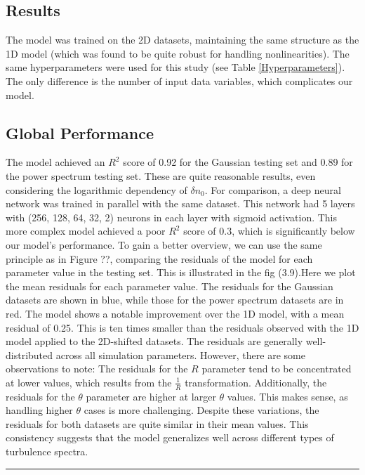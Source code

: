 \documentclass[11pt,a4paper,openany]{report}
\begin{document}
\begin{multicols}{2}
    \section{Results}

    The model was trained on the 2D datasets, maintaining the same structure as the 1D model (which was found to be quite robust for handling nonlinearities). The same hyperparameters were used for this study (see Table \ref{Hyperparameters}). The only difference is the number of input data variables, which complicates our model.

    \subsection{Global Performance}

    The model achieved an $R^2$ score of 0.92 for the Gaussian testing set and 0.89 for the power spectrum testing set. These are quite reasonable results, even considering the logarithmic dependency of $\delta n_0$. For comparison, a deep neural network was trained in parallel with the same dataset. This network had 5 layers with (256, 128, 64, 32, 2) neurons in each layer with sigmoid activation. This more complex model achieved a poor $R^2$ score of 0.3, which is significantly below our model's performance. To gain a better overview, we can use the same principle as in Figure ??, comparing the residuals of the model for each parameter value in the testing set. This is illustrated in the fig (3.9).{Here we plot the mean residuals for each parameter value. The residuals for the Gaussian datasets are shown in blue, while those for the power spectrum datasets are in red.
            The model shows a notable improvement over the 1D model, with a mean residual of 0.25. This is ten times smaller than the residuals observed with the 1D model applied to the 2D-shifted datasets. The residuals are generally well-distributed across all simulation parameters.
            However, there are some observations to note: The residuals for the $R$ parameter tend to be concentrated at lower values, which results from the $\frac{1}{R}$ transformation. Additionally, the residuals for the $\theta$ parameter are higher at larger $\theta$ values. This makes sense, as handling higher $\theta$ cases is more challenging.
            Despite these variations, the residuals for both datasets are quite similar in their mean values. This consistency suggests that the model generalizes well across different types of turbulence spectra.}
\end{multicols}
\rule{\linewidth}{0.4pt}
\end{document}
